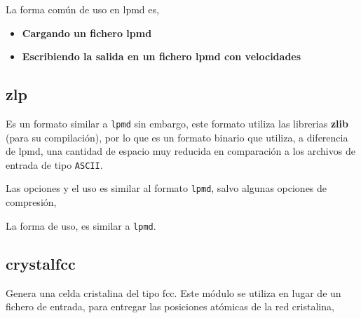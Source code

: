 
La forma com\'un de uso en lpmd es,

\begin{itemize}
 \item \textbf{Cargando un fichero lpmd}
 \item \textbf{Escribiendo la salida en un fichero lpmd con velocidades}
\end{itemize}

\subsection{zlp}

Es un formato similar a \verb|lpmd| sin embargo, este formato utiliza las librerias \textbf{zlib} (para su compilaci\'on), por lo que es un formato binario que utiliza, a diferencia de lpmd, una cantidad de espacio muy reducida en comparaci\'on a los archivos de entrada de tipo \verb|ASCII|.

Las opciones y el uso es similar al formato \verb|lpmd|, salvo algunas opciones de compresi\'on, 


La forma de uso, es similar a \verb|lpmd|.

\subsection{crystalfcc}
Genera una celda cristalina del tipo fcc. Este m\'odulo se utiliza en lugar de un fichero de entrada, para entregar las posiciones at\'omicas de la red cristalina, 


